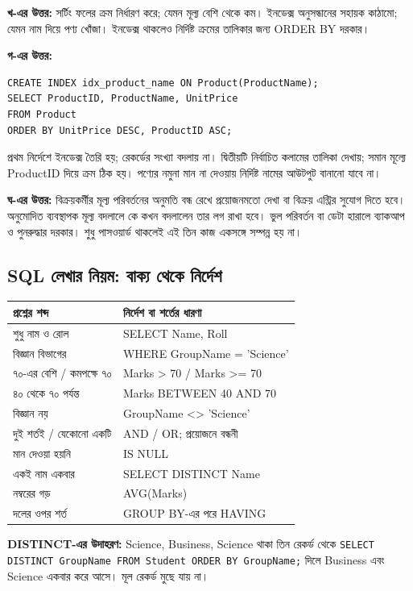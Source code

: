 \textbf{খ-এর উত্তর:} সর্টিং ফলের ক্রম নির্ধারণ করে; যেমন মূল্য বেশি থেকে কম। ইনডেক্স অনুসন্ধানের সহায়ক কাঠামো; যেমন নাম দিয়ে পণ্য খোঁজা। ইনডেক্স থাকলেও নির্দিষ্ট ক্রমের তালিকার জন্য ORDER BY দরকার।

\textbf{গ-এর উত্তর:}
\begin{verbatim}
CREATE INDEX idx_product_name ON Product(ProductName);
SELECT ProductID, ProductName, UnitPrice
FROM Product
ORDER BY UnitPrice DESC, ProductID ASC;
\end{verbatim}
প্রথম নির্দেশে ইনডেক্স তৈরি হয়; রেকর্ডের সংখ্যা বদলায় না। দ্বিতীয়টি নির্বাচিত কলামের তালিকা দেখায়; সমান মূল্যে ProductID দিয়ে ক্রম ঠিক হয়। পণ্যের নমুনা মান না দেওয়ায় নির্দিষ্ট নামের আউটপুট বানানো যাবে না।

\textbf{ঘ-এর উত্তর:} বিক্রয়কর্মীর মূল্য পরিবর্তনের অনুমতি বন্ধ রেখে প্রয়োজনমতো দেখা বা বিক্রয় এন্ট্রির সুযোগ দিতে হবে। অনুমোদিত ব্যবস্থাপক মূল্য বদলালে কে কখন বদলালেন তার লগ রাখা হবে। ভুল পরিবর্তন বা ডেটা হারালে ব্যাকআপ ও পুনরুদ্ধার দরকার। শুধু পাসওয়ার্ড থাকলেই এই তিন কাজ একসঙ্গে সম্পন্ন হয় না।

\subsection{SQL লেখার নিয়ম: বাক্য থেকে নির্দেশ}
\begin{flushleft}
\small
\begin{tabularx}{0.98\linewidth}{|p{40mm}|X|}\hline
প্রশ্নের শব্দ & নির্দেশ বা শর্তের ধারণা\\ \hline
শুধু নাম ও রোল & SELECT Name, Roll\\ \hline
বিজ্ঞান বিভাগের & WHERE GroupName = 'Science'\\ \hline
৭০-এর বেশি / কমপক্ষে ৭০ & Marks > 70 / Marks >= 70\\ \hline
৪০ থেকে ৭০ পর্যন্ত & Marks BETWEEN 40 AND 70\\ \hline
বিজ্ঞান নয় & GroupName <> 'Science'\\ \hline
দুই শর্তই / যেকোনো একটি & AND / OR; প্রয়োজনে বন্ধনী\\ \hline
মান দেওয়া হয়নি & IS NULL\\ \hline
একই নাম একবার & SELECT DISTINCT Name\\ \hline
নম্বরের গড় & AVG(Marks)\\ \hline
দলের ওপর শর্ত & GROUP BY-এর পরে HAVING\\ \hline
\end{tabularx}
\end{flushleft}
\textbf{DISTINCT-এর উদাহরণ:} Science, Business, Science থাকা তিন রেকর্ড থেকে \texttt{SELECT DISTINCT GroupName FROM Student ORDER BY GroupName;} দিলে Business এবং Science একবার করে আসে। মূল রেকর্ড মুছে যায় না।

